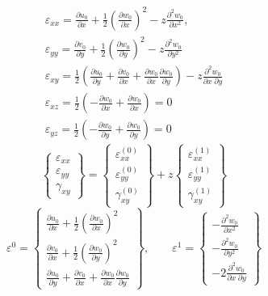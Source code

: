 \documentclass[11pt,letterpaper,titlepage,draft]{article}
\newcommand{\PDer}[2]{\frac{\partial #1}{\partial #2}}
\newcommand{\PPDer}[2]{\frac{\partial^2 #1}{\partial #2^2}}
\newcommand{\PPDerMix}[3]{\frac{\partial^2 #1}{\partial #2\; \partial #3}}
\numberwithin{equation}{subsection}
\begin{document}
\begin{gather}\label{E:S1001:SS101:4}
\varepsilon_{xx} = \PDer{u_0}{x} + \frac{1}{2}\left(\PDer{w_0}{x}\right)^2 - z \PPDer{w_0}{x},
\\
\varepsilon_{yy} = \PDer{v_0}{y} + \frac{1}{2}\left(\PDer{w_0}{y}\right)^2 - z \PPDer{w_0}{y}
\\
\varepsilon_{xy} = \frac{1}{2}\left( \PDer{u_0}{y} + \PDer{v_0}{x} + \PDer{w_0}{x}\PDer{w_0}{y} \right) - z\PPDerMix{w_0}{x}{y}
\\
\varepsilon_{xz} = \frac{1}{2}\left( -\PDer{w_0}{x} + \PDer{w_0}{x} \right) = 0
\\
\varepsilon_{yz} = \frac{1}{2}\left( -\PDer{w_0}{y} + \PDer{w_0}{y} \right)  = 0
\end{gather}
\begin{equation}\label{E:S1001:SS101:5}
    \begin{Bmatrix}
    \varepsilon_{xx} \\[3pt]
    \varepsilon_{yy} \\[3pt]
    \gamma_{xy}
    \end{Bmatrix}
    = 
    \begin{Bmatrix}
    \varepsilon_{xx}^{(0)} \\[3pt]
    \varepsilon_{yy}^{(0)} \\[3pt]
    \gamma_{xy}^{(0)}
    \end{Bmatrix}
    + z
    \begin{Bmatrix}
    \varepsilon_{xx}^{(1)} \\[3pt]
    \varepsilon_{yy}^{(1)} \\[3pt]
    \gamma_{xy}^{(1)}
    \end{Bmatrix}
\end{equation}
\begin{equation}\label{E:S1001:SS101:6}
    {\varepsilon^0}
    =
    \begin{Bmatrix}
    \PDer{u_0}{x} + \frac{1}{2}\left(\PDer{w_0}{x}\right)^2\\[3pt]
    \PDer{v_0}{x} + \frac{1}{2}\left(\PDer{w_0}{y}\right)^2\\[3pt]
    \PDer{u_0}{y} + \PDer{v_0}{x} + \PDer{w_0}{x}\PDer{w_0}{y}
    \end{Bmatrix}, \qquad
    {\varepsilon^1}
    =
    \begin{Bmatrix}
    -\PPDer{w_0}{x}\\[3pt]
    -\PPDer{w_0}{y}\\[3pt]
    -2\PPDerMix{w_0}{x}{y}
    \end{Bmatrix} 
\end{equation}
\end{document}
